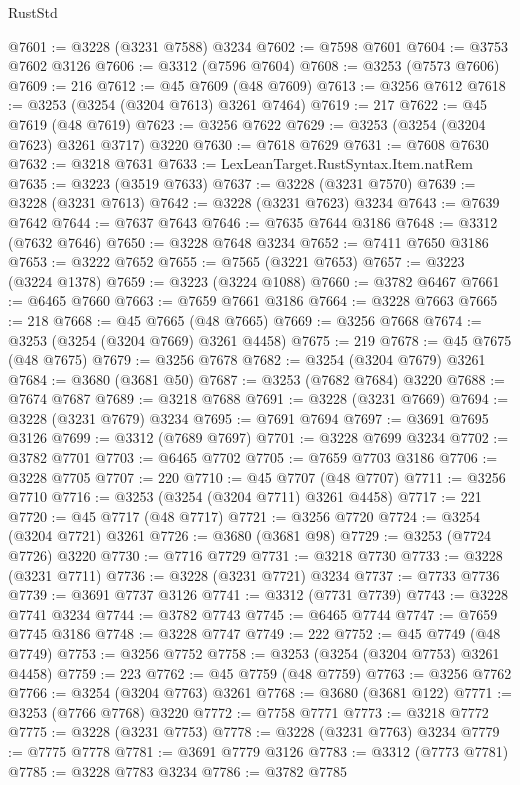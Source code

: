 \begin{lexlean}{RustStd}
\begin{coremodule}
@7601 := @3228 (@3231 @7588) @3234
@7602 := @7598 @7601
@7604 := @3753 @7602 @3126
@7606 := @3312 (@7596 @7604)
@7608 := @3253 (@7573 @7606)
@7609 := 216
@7612 := @45 @7609 (@48 @7609)
@7613 := @3256 @7612
@7618 := @3253 (@3254 (@3204 @7613) @3261 @7464)
@7619 := 217
@7622 := @45 @7619 (@48 @7619)
@7623 := @3256 @7622
@7629 := @3253 (@3254 (@3204 @7623) @3261 @3717) @3220
@7630 := @7618 @7629
@7631 := @7608 @7630
@7632 := @3218 @7631
@7633 := LexLeanTarget.RustSyntax.Item.natRem
@7635 := @3223 (@3519 @7633)
@7637 := @3228 (@3231 @7570)
@7639 := @3228 (@3231 @7613)
@7642 := @3228 (@3231 @7623) @3234
@7643 := @7639 @7642
@7644 := @7637 @7643
@7646 := @7635 @7644 @3186
@7648 := @3312 (@7632 @7646)
@7650 := @3228 @7648 @3234
@7652 := @7411 @7650 @3186
@7653 := @3222 @7652
@7655 := @7565 (@3221 @7653)
@7657 := @3223 (@3224 @1378)
@7659 := @3223 (@3224 @1088)
@7660 := @3782 @6467
@7661 := @6465 @7660
@7663 := @7659 @7661 @3186
@7664 := @3228 @7663
@7665 := 218
@7668 := @45 @7665 (@48 @7665)
@7669 := @3256 @7668
@7674 := @3253 (@3254 (@3204 @7669) @3261 @4458)
@7675 := 219
@7678 := @45 @7675 (@48 @7675)
@7679 := @3256 @7678
@7682 := @3254 (@3204 @7679) @3261
@7684 := @3680 (@3681 @50)
@7687 := @3253 (@7682 @7684) @3220
@7688 := @7674 @7687
@7689 := @3218 @7688
@7691 := @3228 (@3231 @7669)
@7694 := @3228 (@3231 @7679) @3234
@7695 := @7691 @7694
@7697 := @3691 @7695 @3126
@7699 := @3312 (@7689 @7697)
@7701 := @3228 @7699 @3234
@7702 := @3782 @7701
@7703 := @6465 @7702
@7705 := @7659 @7703 @3186
@7706 := @3228 @7705
@7707 := 220
@7710 := @45 @7707 (@48 @7707)
@7711 := @3256 @7710
@7716 := @3253 (@3254 (@3204 @7711) @3261 @4458)
@7717 := 221
@7720 := @45 @7717 (@48 @7717)
@7721 := @3256 @7720
@7724 := @3254 (@3204 @7721) @3261
@7726 := @3680 (@3681 @98)
@7729 := @3253 (@7724 @7726) @3220
@7730 := @7716 @7729
@7731 := @3218 @7730
@7733 := @3228 (@3231 @7711)
@7736 := @3228 (@3231 @7721) @3234
@7737 := @7733 @7736
@7739 := @3691 @7737 @3126
@7741 := @3312 (@7731 @7739)
@7743 := @3228 @7741 @3234
@7744 := @3782 @7743
@7745 := @6465 @7744
@7747 := @7659 @7745 @3186
@7748 := @3228 @7747
@7749 := 222
@7752 := @45 @7749 (@48 @7749)
@7753 := @3256 @7752
@7758 := @3253 (@3254 (@3204 @7753) @3261 @4458)
@7759 := 223
@7762 := @45 @7759 (@48 @7759)
@7763 := @3256 @7762
@7766 := @3254 (@3204 @7763) @3261
@7768 := @3680 (@3681 @122)
@7771 := @3253 (@7766 @7768) @3220
@7772 := @7758 @7771
@7773 := @3218 @7772
@7775 := @3228 (@3231 @7753)
@7778 := @3228 (@3231 @7763) @3234
@7779 := @7775 @7778
@7781 := @3691 @7779 @3126
@7783 := @3312 (@7773 @7781)
@7785 := @3228 @7783 @3234
@7786 := @3782 @7785

\end{coremodule}
\end{lexlean}
